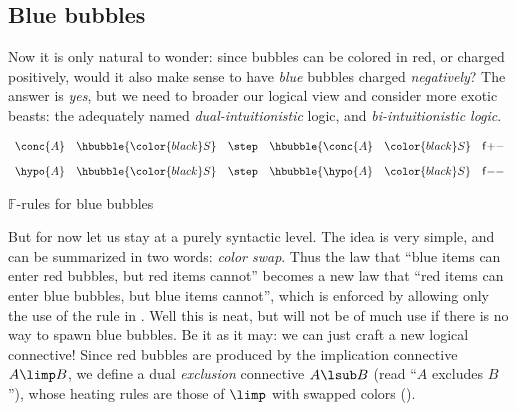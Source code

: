 \subsection{Blue bubbles}

Now it is only natural to wonder: since bubbles can be colored in red, or
charged positively, would it also make sense to have \emph{blue} bubbles charged
\emph{negatively}? The answer is \emph{yes}, but we need to broader our logical
view and consider more exotic beasts: the adequately named
\emph{dual-intuitionistic} logic, and \emph{bi-intuitionistic logic}.

\begin{marginfigure}
  $$
  \begin{array}{rclr}
    \conc{A}~~~\hbubble{\color{black}S} &\step &\hbubble{\conc{A}~~~\color{black}S} &\mathsf{f}{+}{-} \vspace{1em}\\
    \hypo{A}~~~\hbubble{\color{black}S} &\step &\hbubble{\hypo{A}~~~\color{black}S} &\mathsf{f}{-}{-} \\
  \end{array}
  $$
  \caption{$\mathbb{F}$-rules for blue bubbles}
\end{marginfigure}

But for now let us stay at a purely syntactic level. The idea is very simple,
and can be summarized in two words: \emph{color swap}. Thus the law that ``blue
items can enter red bubbles, but red items cannot'' becomes a new law that ``red
items can enter blue bubbles, but blue items cannot'', which is enforced by
allowing only the use of the {} rule in
. Well this is neat, but will not be of much use if
there is no way to spawn blue bubbles. Be it as it may: we can just craft a new
logical connective! Since red bubbles are produced by the implication connective
$A \limp B$, we define a dual \emph{exclusion} connective $A \lsub B$ (read
``$A$ excludes $B$''), whose heating rules are those of $\limp$ with swapped colors
().

